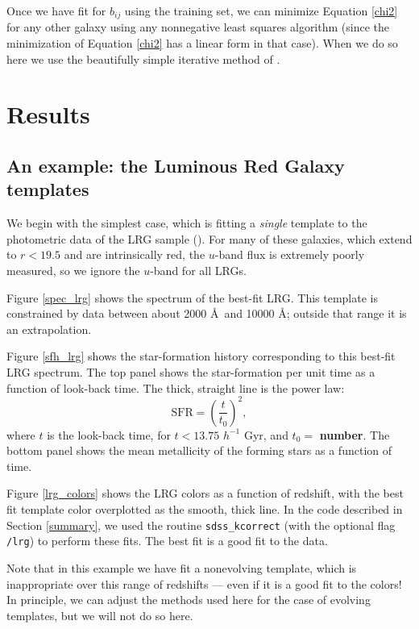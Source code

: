 \documentclass[10pt,preprint]{aastex}
\begin{document}
Once we have fit for $b_{ij}$ using the training set, we can minimize
Equation \ref{chi2} for any other galaxy using any nonnegative least
squares algorithm (since the minimization of Equation \ref{chi2} has a
linear form in that case).  When we do so here we use the beautifully
simple iterative method of \citet{sha02a}.

\section{Results}
\label{results}

\subsection{An example: the Luminous Red Galaxy templates}

We begin with the simplest case, which is fitting a {\it single}
template to the photometric data of the LRG sample
(\citealt{eisenstein01a}). For many of these galaxies, which extend to
$r<19.5$ and are intrinsically red, the $u$-band flux is extremely
poorly measured, so we ignore the $u$-band for all LRGs. 

Figure \ref{spec_lrg} shows the spectrum of the best-fit LRG.  This
template is constrained by data between about 2000 \AA\ and 10000 \AA;
outside that range it is an extrapolation.

Figure \ref{sfh_lrg} shows the star-formation history corresponding to
this best-fit LRG spectrum. The top panel shows the star-formation per
unit time as a function of look-back time.  The thick, straight line
is the power law:
\begin{equation}
\mathrm{SFR} = \left(\frac{t}{t_0}\right)^2,
\end{equation}
where $t$ is the look-back time, for $t<13.75$ $h^{-1}$ Gyr, and $t_0=$
{\bf number}. The bottom panel shows the mean metallicity of the
forming stars as a function of time.

Figure \ref{lrg_colors} shows the LRG colors as a function of
redshift, with the best fit template color overplotted as the smooth,
thick line. In the code described in Section \ref{summary}, we used the
routine {\tt sdss\_kcorrect} (with the optional flag {\tt /lrg}) to
perform these fits. The best fit is a good fit to the data.

Note that in this example we have fit a nonevolving template, which is
inappropriate over this range of redshifts --- even if it is a good
fit to the colors! In principle, we can adjust the methods used here
for the case of evolving templates, but we will not do so here.
\end{document}
